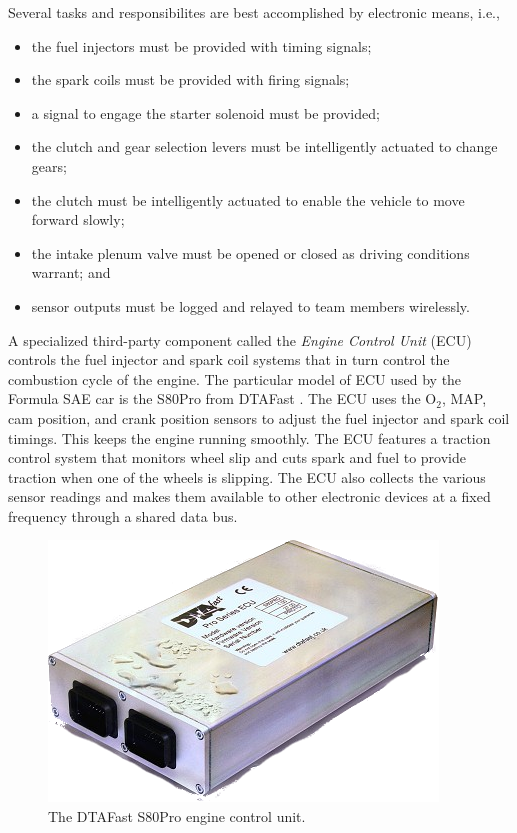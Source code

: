 Several tasks and responsibilites are best accomplished by electronic means, i.e.,

\begin{itemize}
\item the fuel injectors must be provided with timing signals;
\item the spark coils must be provided with firing signals;
\item a signal to engage the starter solenoid must be provided;
\item the clutch and gear selection levers must be intelligently actuated to change gears; 
\item the clutch must be intelligently actuated to enable the vehicle to move forward slowly;
\item the intake plenum valve must be opened or closed as driving conditions warrant; and
\item sensor outputs must be logged and relayed to team members wirelessly.
\end{itemize}

A specialized third-party component called the \emph{Engine Control Unit} (ECU) controls the 
fuel injector and spark coil systems that in turn control the combustion cycle of the engine. 
The particular model of ECU used by the Formula SAE car is the S80Pro from DTAFast \cite{s60pro}. 
The ECU uses the O$_{2}$, MAP, cam position, and crank position sensors to adjust the fuel injector 
and spark coil timings. This keeps the engine running smoothly. The ECU features a traction control 
system that monitors wheel slip and cuts spark and fuel to provide traction when one of the wheels 
is slipping. The ECU also collects the various sensor readings and makes them available to other
electronic devices at a fixed frequency through a shared data bus. 

\begin{figure}[H]
	\centering
	 	\includegraphics[scale=0.5]{figures/s80.png}
    \caption{The DTAFast S80Pro engine control unit.}
    \label{fig:s80pro_product}
\end{figure}

